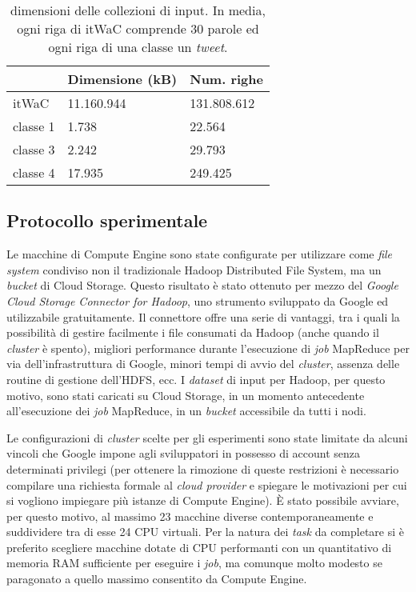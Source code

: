 \begin{table}[ht]
\centering
\begin{tabular}{l|l|l|}
\cline{2-3}
                               & Dimensione (kB)   & Num. righe \\ \hline
\multicolumn{1}{|l|}{itWaC}    & 11.160.944        & 131.808.612  \\
\multicolumn{1}{|l|}{classe 1} & 1.738             & 22.564      \\
\multicolumn{1}{|l|}{classe 3} & 2.242             & 29.793      \\
\multicolumn{1}{|l|}{classe 4} & 17.935            & 249.425     \\ \hline
\end{tabular}
\caption{dimensioni delle collezioni di input. In media, ogni riga di itWaC comprende 30 parole ed ogni riga di una classe un \textit{tweet}.}
\label{tabinputcollez}
\end{table}


\subsection{Protocollo sperimentale}
\label{espindexproto}

Le macchine di Compute Engine sono state configurate per utilizzare come \textit{file system} condiviso non il tradizionale Hadoop Distributed File System, ma un \textit{bucket} di Cloud Storage.
Questo risultato è stato ottenuto per mezzo del \textit{Google Cloud Storage Connector for Hadoop}, uno strumento sviluppato da Google ed utilizzabile gratuitamente.
Il connettore offre una serie di vantaggi, tra i quali la possibilità di gestire facilmente i file consumati da Hadoop (anche quando il \textit{cluster} è spento), migliori performance 
durante l'esecuzione di \textit{job} MapReduce per via dell'infrastruttura di Google, minori tempi di avvio del \textit{cluster}, assenza delle routine di gestione dell'HDFS, ecc.
I \textit{dataset} di input per Hadoop, per questo motivo, sono stati caricati su Cloud Storage, in un momento antecedente all'esecuzione dei \textit{job} MapReduce, in un \textit{bucket} accessibile da tutti i nodi.

Le configurazioni di \textit{cluster} scelte per gli esperimenti sono state limitate da alcuni vincoli che Google impone agli sviluppatori in possesso di account senza determinati privilegi (per ottenere la rimozione di queste restrizioni 
è necessario compilare una richiesta formale al \textit{cloud provider} e spiegare le motivazioni per cui si vogliono impiegare più istanze di Compute Engine).
È stato possibile avviare, per questo motivo, al massimo 23 macchine diverse contemporaneamente e suddividere tra di esse 24 CPU virtuali.
Per la natura dei \textit{task} da completare si è preferito scegliere macchine dotate di CPU performanti con un quantitativo di memoria RAM sufficiente per eseguire i \textit{job}, 
ma comunque molto modesto se paragonato a quello massimo consentito da Compute Engine.

